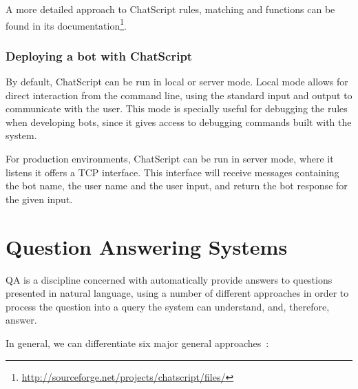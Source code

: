 A more detailed approach to ChatScript rules, matching and functions can be found in its documentation\footnote{\url{http://sourceforge.net/projects/chatscript/files/}}.

\subsubsection{Deploying a bot with ChatScript}

By default, ChatScript can be run in local or server mode. Local mode allows for direct interaction from the command line, using the standard input and output to communicate with the user. This mode is specially useful for debugging the rules when developing bots, since it gives access to debugging commands built with the system.

For production environments, ChatScript can be run in server mode, where it listens it offers a TCP interface. This interface will receive messages containing the bot name, the user name and the user input, and return the bot response for the given input.

\section{Question Answering Systems}
\label{sec:qa_sys}

\ac{QA} is a discipline concerned with automatically provide answers to questions presented in natural language, using a number of different approaches in order to process the question into a query the system can understand, and, therefore, answer.

In general, we can differentiate six major general approaches~\cite{unger2014an}:

